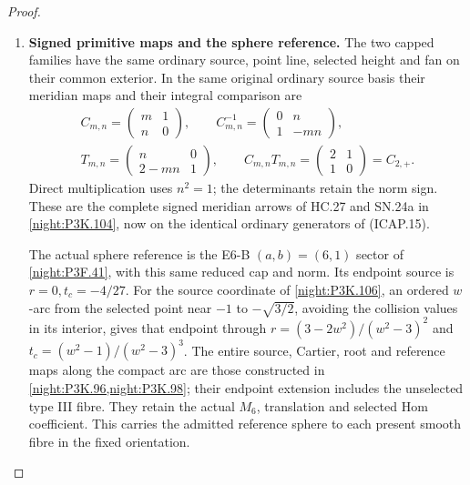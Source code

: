 \begin{proof}
\begin{enumerate}[label=\arabic*.]
\item \textbf{Signed primitive maps and the sphere reference.}
The two capped families have the same ordinary source,
point line, selected height and fan on their common exterior.
In the same original ordinary source basis their meridian
maps and their integral comparison are
\[
\begin{gathered}
 C_{m,n}=\begin{pmatrix}m&1\\n&0\end{pmatrix},\qquad
 C_{m,n}^{-1}=\begin{pmatrix}0&n\\1&-mn\end{pmatrix},\\
 T_{m,n}=\begin{pmatrix}n&0\\2-mn&1\end{pmatrix},\qquad
 C_{m,n}T_{m,n}=\begin{pmatrix}2&1\\1&0\end{pmatrix}=C_{2,+}.
\end{gathered}                                         \tag{ICAP.17}
\]
Direct multiplication uses \(n^2=1\); the determinants
retain the norm sign. These are the complete signed meridian
arrows of HC.27 and SN.24a in \cref{night:P3K.104}, now
on the identical ordinary generators of (ICAP.15).

The actual sphere reference is the E6-B \((a,b)=(6,1)\)
sector of \cref{night:P3F.41}, with this same reduced cap
and norm. Its endpoint source is \(r=0,t_c=-4/27\).
For the source coordinate of \cref{night:P3K.106}, an ordered
\(w\)-arc from the selected point near \(-1\) to
\(-\sqrt{3/2}\), avoiding the collision values in its
interior, gives that endpoint through
\(r=(3-2w^2)/(w^2-3)^2\) and
\(t_c=(w^2-1)/(w^2-3)^3\). The entire source, Cartier,
root and reference maps along the compact arc are those
constructed in \cref{night:P3K.96,night:P3K.98}; their
endpoint extension includes the unselected type III fibre.
They retain the actual \(M_6\), translation and selected
Hom coefficient. This carries the admitted reference sphere
to each present smooth fibre in the fixed orientation.


\end{enumerate}
\end{proof}
